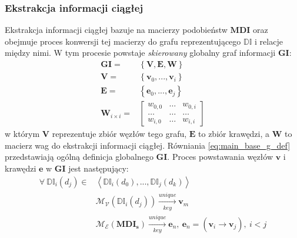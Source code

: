 \subsubsection{Ekstrakcja informacji ciągłej}
Ekstrakcja informacji ciągłej bazuje na macierzy podobieństw $\mathbf{MDI}$ oraz obejmuje proces
konwersji tej macierzy do grafu reprezentującego $ \mathbb{DI}$ i relacje między nimi. W tym procesie
powstaje \textit{skierowany} globalny graf informacji $\mathbf{GI}$:
\begin{equation} 
    \label{eq:main_base_g_def}
    \begin{aligned}
        \mathbf{GI} = &
            \left\{
                \mathbf{V}, \mathbf{E}, \mathbf{W}
            \right\}
        \\
        \mathbf{V} = &
            \left\{ \mathbf{v}_{0}, ..., \mathbf{v}_{i} \right\}
        \\
        \mathbf{E} = &
            \left\{ \mathbf{e}_{0}, ..., \mathbf{e}_{j} \right\}
        \\
        \mathbf{W}_{i \times i} = &
            \left[ 
                \begin{array}{ccc}
                    w_{0, 0} & \dots & w_{0, i} 
                    \\
                    \dots & \dots & \dots 
                    \\
                    w_{i, 0} & \dots & w_{i, i}
                \end{array}
            \right]
    \end{aligned}
\end{equation}
w którym $\mathbf{V}$ reprezentuje zbiór węzłów tego grafu, $\mathbf{E}$ to zbiór krawędzi,
a $\mathbf{W}$ to macierz wag do ekstrakcji informacji ciągłej. 
Równiania \ref{eq:main_base_g_def} przedstawiają ogólną definicja globalnego $\mathbf{GI}$. 
Proces powstawania węzłów $\mathbf{v}$ i krawędzi $\mathbf{e}$ w $\mathbf{GI}$ jest następujący:
\begin{equation}
    \label{eq:func_map_v_e_to_g}
    \begin{aligned}
        \forall \: \mathbb{DI}_{i}(d_{j}) \in &
        \left<
            \mathbb{DI}_{i}(d_0), ..., \mathbb{DI}_{j}(d_k)
        \right> 
        \\
        & \mathcal{M_{V}}(\mathbb{DI}_{i}(d_{j})) 
            \xrightarrow[key]{unique} 
                \mathbf{v}_{m} 
        \\
        & \mathcal{M_{E}}(\mathbf{MDI_s}) 
            \xrightarrow[key]{unique} 
                \mathbf{e}_{n}, 
            \: 
                \mathbf{e}_{n} = (\mathbf{v}_{i} \xrightarrow[]{} \mathbf{v}_{j}), \: i < j
    \end{aligned}
\end{equation}
